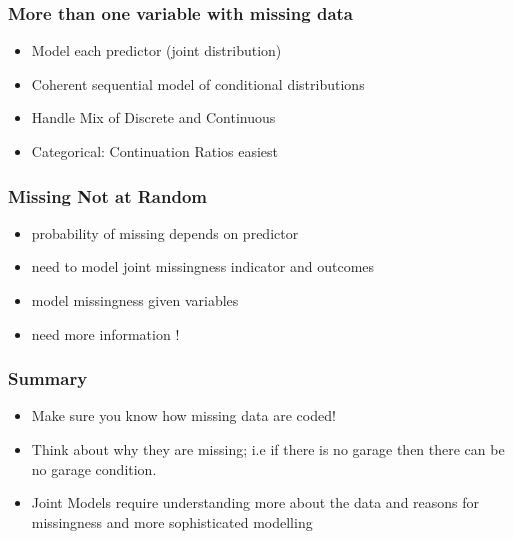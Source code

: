 \documentclass[]{beamer}\usepackage[]{graphicx}\usepackage[]{color}
\begin{document}
\begin{frame} \frametitle{More than one variable with missing data}

\begin{itemize}
\item Model each predictor (joint distribution)   \pause
\item Coherent sequential model of conditional distributions  \pause
\item Handle Mix of Discrete and Continuous  \pause
\item Categorical:  Continuation Ratios easiest  \pause
\end{itemize}

\end{frame}

\begin{frame} \frametitle{Missing Not at Random}

\begin{itemize}
\item probability of missing depends on predictor  \pause
\item need to model joint missingness indicator and outcomes  \pause
\item model missingness given variables  \pause
\item need more information !
\end{itemize}

\end{frame}

\begin{frame}\frametitle{Summary}
\begin{itemize}
\item Make sure you know how missing data are coded!  \pause
\item Think about why they are missing; i.e if there is no garage then there can be no garage condition.  \pause
\item  Joint Models require understanding more about the data and reasons for missingness and more sophisticated modelling  \pause
\end{itemize}
\end{frame}
\end{document}
